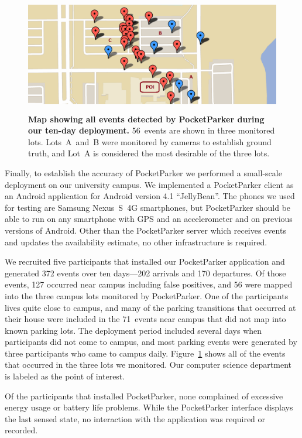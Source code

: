 \begin{figure}
\centering
\includegraphics[width=\textwidth,height=2in]{./figures/detectedEventsOnMap.pdf}

\caption{\textbf{Map showing all events detected by PocketParker during our
ten-day deployment.} 56~events are shown in three monitored lots.
Lots~A~and~B were monitored by cameras to establish ground truth, and Lot~A
is considered the most desirable of the three lots.}

\label{fig-events}
\end{figure}

Finally, to establish the accuracy of PocketParker we performed a small-scale
deployment on our university campus. We implemented a PocketParker client as
an Android application for Android version 4.1 ``JellyBean''. The phones we
used for testing are Samsung Nexus~S~4G smartphones, but PocketParker should
be able to run on any smartphone with GPS and an accelerometer and on
previous versions of Android. Other than the PocketParker server which
receives events and updates the availability estimate, no other
infrastructure is required.

We recruited five participants that installed our PocketParker application
and generated 372 events over ten days---202 arrivals and 170 departures. Of
those events, 127 occurred near campus including false positives, and 56 were
mapped into the three campus lots monitored by PocketParker. One of the
participants lives quite close to campus, and many of the parking transitions
that occurred at their house were included in the 71~events near campus that
did not map into known parking lots. The deployment period included several
days when participants did not come to campus, and most parking events were
generated by three participants who came to campus daily.
Figure~\ref{fig-events} shows all of the events that occurred in the three
lots we monitored. Our computer science department is labeled as the point of
interest.

Of the participants that installed PocketParker, none complained of excessive
energy usage or battery life problems. While the PocketParker interface
displays the last sensed state, no interaction with the application was
required or recorded.

